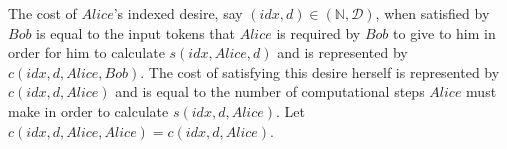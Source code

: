 \begin{definition}
  The cost of $Alice$'s indexed desire, say $\left(idx, d\right) \in \left(\mathbb{N}, \mathcal{D}\right)$, when satisfied by
  $Bob$ is equal to the input tokens that $Alice$ is required by $Bob$ to give to him in order for him to calculate
  $s\left(idx, Alice, d\right)$ and is represented by $c\left(idx, d, Alice, Bob\right)$. The cost of satisfying this desire
  herself is represented by $c\left(idx, d, Alice\right)$ and is equal to the number of computational steps $Alice$ must make
  in order to calculate $s\left(idx, d, Alice\right)$. Let $c\left(idx, d, Alice, Alice\right) = c\left(idx, d, Alice\right)$.
\end{definition}

